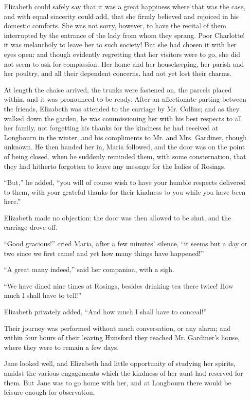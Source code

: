 Elizabeth could safely say that it was a great happiness where that was the case, and with equal sincerity could add, that she firmly believed and rejoiced in his domestic comforts. She was not sorry, however, to have the recital of them interrupted by the entrance of the lady from whom they sprang. Poor Charlotte! it was melancholy to leave her to such society! But she had chosen it with her eyes open; and though evidently regretting that her visitors were to go, she did not seem to ask for compassion. Her home and her housekeeping, her parish and her poultry, and all their dependent concerns, had not yet lost their charms.

At length the chaise arrived, the trunks were fastened on, the parcels placed within, and it was pronounced to be ready. After an affectionate parting between the friends, Elizabeth was attended to the carriage by Mr. Collins; and as they walked down the garden, he was commissioning her with his best respects to all her family, not forgetting his thanks for the kindness he had received at Longbourn in the winter, and his compliments to Mr. and Mrs. Gardiner, though unknown. He then handed her in, Maria followed, and the door was on the point of being closed, when he suddenly reminded them, with some consternation, that they had hitherto forgotten to leave any message for the ladies of Rosings.




``But,'' he added, ``you will of course wish to have your humble respects delivered to them, with your grateful thanks for their kindness to you while you have been here.''

Elizabeth made no objection: the door was then allowed to be shut, and the carriage drove off.

``Good gracious!'' cried Maria, after a few minutes' silence, ``it seems but a day or two since we first came! and yet how many things have happened!''

``A great many indeed,'' said her companion, with a sigh.

``We have dined nine times at Rosings, besides drinking tea there twice! How much I shall have to tell!''

Elizabeth privately added, ``And how much I shall have to conceal!''

Their journey was performed without much conversation, or any alarm; and within four hours of their leaving Hunsford they reached Mr. Gardiner's house, where they were to remain a few days.

Jane looked well, and Elizabeth had little opportunity of studying her spirits, amidst the various engagements which the kindness of her aunt had reserved for them. But Jane was to go home with her, and at Longbourn there would be leisure enough for observation.

